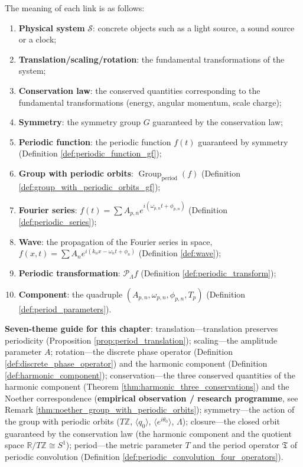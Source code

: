 \begin{remark}
The meaning of each link is as follows:
\begin{enumerate}[label=(\roman*)]
    \item \textbf{Physical system} $\mathcal{S}$: concrete objects such as a light source, a sound source or a clock;
    \item \textbf{Translation/scaling/rotation}: the fundamental transformations of the system;
    \item \textbf{Conservation law}: the conserved quantities corresponding to the fundamental transformations (energy, angular momentum, scale charge);
    \item \textbf{Symmetry}: the symmetry group $G$ guaranteed by the conservation law;
    \item \textbf{Periodic function}: the periodic function $f(t)$ guaranteed by symmetry (Definition \ref{def:periodic_function_gf});
    \item \textbf{Group with periodic orbits}: $\operatorname{Group}_{\mathrm{period}}(f)$ (Definition \ref{def:group_with_periodic_orbits_gf});
    \item \textbf{Fourier series}: $f(t) = \sum A_{p,n} e^{i(\omega_{p,n} t + \phi_{p,n})}$ (Definition \ref{def:periodic_series});
    \item \textbf{Wave}: the propagation of the Fourier series in space, $f(x,t) = \sum A_n e^{i(k_n x - \omega_n t + \phi_n)}$ (Definition \ref{def:wave});
    \item \textbf{Periodic transformation}: $\mathcal{P}_\Lambda f$ (Definition \ref{def:periodic_transform});
    \item \textbf{Component}: the quadruple $(A_{p,n}, \omega_{p,n}, \phi_{p,n}, T_p)$ (Definition \ref{def:period_parameters}).
\end{enumerate}

\textbf{Seven-theme guide for this chapter}: translation---translation preserves periodicity (Proposition \ref{prop:period_translation}); scaling---the amplitude parameter $A$; rotation---the discrete phase operator (Definition \ref{def:discrete_phase_operator}) and the harmonic component (Definition \ref{def:harmonic_component}); conservation---the three conserved quantities of the harmonic component (Theorem \ref{thm:harmonic_three_conservations}) and the Noether correspondence (\textbf{empirical observation / research programme}, see Remark \ref{thm:noether_group_with_periodic_orbits}); symmetry---the action of the group with periodic orbits ($T\mathbb{Z}$, $\langle q_0\rangle$, $\langle e^{i\theta_0}\rangle$, $\Lambda$); closure---the closed orbit guaranteed by the conservation law (the harmonic component and the quotient space $\mathbb{R}/T\mathbb{Z}\cong S^1$); period---the metric parameter $T$ and the period operator $\mathfrak{T}$ of periodic convolution (Definition \ref{def:periodic_convolution_four_operators}).
\end{remark}

